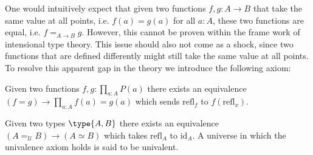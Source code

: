     One would intuitively expect that given two functions $f,g:A\rightarrow B$ that take the same value at all points, i.e. $f(a)=g(a)$ for all $a:A$, these two functions are equal, i.e. $f=_{A\rightarrow B}g$. However, this cannot be proven within the frame work of intensional type theory. This issue should also not come as a shock, since two functions that are defined differently might still take the same value at all points. To resolve this apparent gap in the theory we introduce the following axiom:
    \begin{axiom}
        Given two functions $f,g:\prod_{a:A}P(a)$ there exists an equivalence $(f=g)\rightarrow\prod_{a:A}f(a)=g(a)$ which sends $\text{refl}_f$ to $f(\text{refl}_x)$.
    \end{axiom}
    \begin{axiom}
        Given two types $\type{A,B}$ there exists an equivalence $(A=_{\mathcal{U}}B)\rightarrow(A\simeq B)$ which takes $\text{refl}_A$ to $\text{id}_A$. A universe in which the univalence axiom holds is said to be univalent.
    \end{axiom}